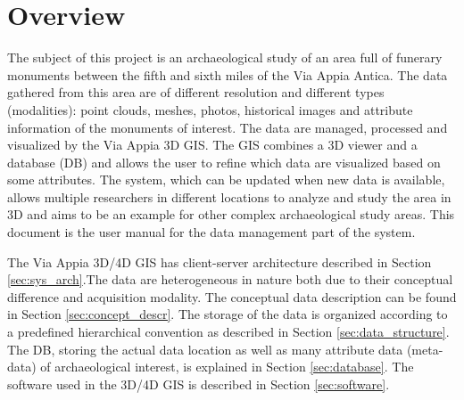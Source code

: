 \section{Overview}
\label{sec:dataman_overview}

 The subject of this project is an archaeological study of an area full of funerary monuments between the fifth and sixth miles of the Via Appia Antica. The data gathered from this area are of different resolution and different types (modalities): point clouds, meshes, photos, historical images and attribute information of the monuments of interest. The data are managed, processed and visualized by the Via Appia 3D GIS. The GIS combines a 3D viewer and a database (DB) and allows the user to refine which data are visualized based on some attributes. The system, which can be updated when new data is available, allows multiple researchers in different locations to analyze and study the area in 3D and aims to be an example for other complex archaeological study areas. This document is the user manual for the data management part of the system.

The Via Appia 3D/4D GIS has client-server architecture described in Section \ref{sec:sys_arch}.The data are heterogeneous in nature both due to their conceptual difference and acquisition modality. The conceptual data description can be found in Section \ref{sec:concept_descr}. The storage of the data is organized according to a predefined hierarchical convention as described in Section \ref{sec:data_structure}. The DB, storing the actual data location as well as many attribute data (meta-data) of archaeological interest, is explained in Section \ref{sec:database}. The software used in the 3D/4D GIS is described in Section \ref{sec:software}.